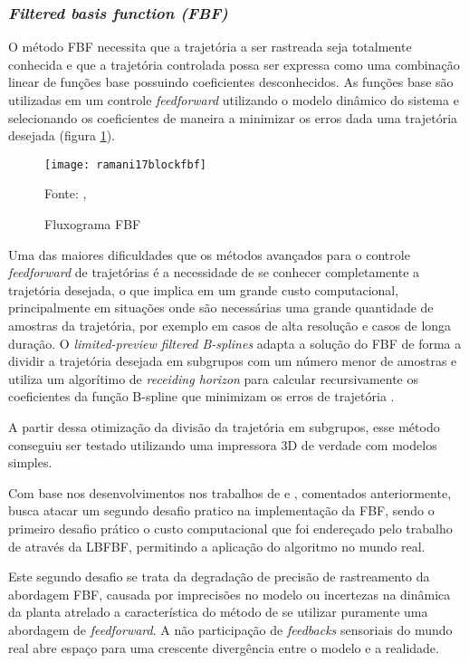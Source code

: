 \subsubsection{\textit{Filtered basis function (FBF)}}
O método FBF necessita que a trajetória a ser rastreada seja totalmente
conhecida e que a trajetória controlada possa ser expressa como
uma combinação linear de funções base possuindo coeficientes desconhecidos.
As funções base são utilizadas em um controle \textit{feedforward} utilizando
o modelo dinâmico do sistema e selecionando os coeficientes de maneira a
minimizar os erros dada uma trajetória desejada (figura \ref{fig:flowchart_fbf}).
\cite{ramani17}

\begin{figure}[!htb]
    \centering
    \caption{Fluxograma FBF}
    \texttt{[image: ramani17blockfbf]}

    {\footnotesize Fonte: \citeauthor{ramani17}, \citeyear{ramani17}}
    \label{fig:flowchart_fbf}
\end{figure}

Uma das maiores dificuldades que os métodos avançados para o
controle \textit{feedforward} de trajetórias é a necessidade de se conhecer
completamente a trajetória desejada, o que implica em um grande custo
computacional, principalmente em situações onde são necessárias uma
grande quantidade de amostras da trajetória, por exemplo em casos de alta resolução
e casos de longa duração.
O \textit{limited-preview filtered B-splines} adapta a solução do FBF de forma a dividir a 
trajetória desejada em subgrupos com um número menor de amostras e utiliza um algorítimo de 
\textit{receiding horizon} para calcular recursivamente os coeficientes da função B-spline que 
minimizam os erros de trajetória \cite{duan18}.

A partir dessa otimização da divisão da trajetória em subgrupos, esse método
conseguiu ser testado utilizando uma impressora 3D de verdade com modelos simples.

Com base nos desenvolvimentos nos trabalhos de \cite{ramani17} e \cite{duan18}, comentados anteriormente, 
\cite{ramani20} busca atacar um segundo desafio pratico na implementação da FBF, sendo o primeiro desafio prático
o custo computacional que foi endereçado pelo trabalho de \cite{duan18} através da LBFBF, permitindo a aplicação
do algoritmo no mundo real.

Este segundo desafio se trata da degradação de precisão de rastreamento da abordagem FBF, causada por
imprecisões no modelo ou incertezas na dinâmica da planta atrelado a característica do método de se
utilizar puramente uma abordagem de \textit{feedforward}. A não participação de \textit{feedbacks} sensoriais
do mundo real abre espaço para uma crescente divergência entre o modelo e a realidade.

